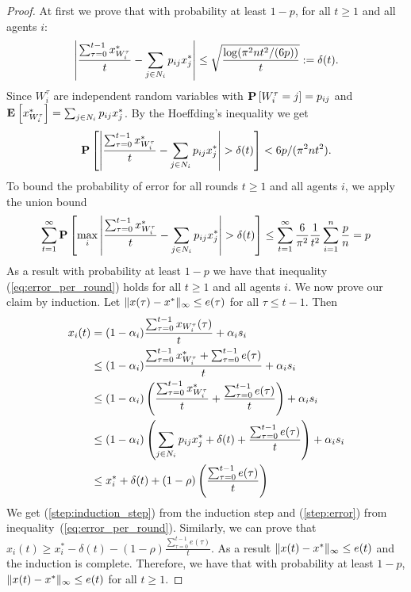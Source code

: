 \begin{proof}
At first we prove that with probability at least $1-p$,
for all $t \geq 1$ and all agents $i$:
\begin{equation}\label{eq:error_per_round}
    \left|
    \frac{\sum_{\tau=0}^{t-1} x^*_{W_i^\tau}}{t} -
    \sum_{j \in N_i} p_{ij} x^*_j
    \right| \leq
    \sqrt{ \frac{\log(\pi^2 n t^2/(6 p))}{t}} :=
    \delta(t).
\end{equation}
Since $W_i^\tau$ are independent random variables with
$\bm{\mathrm{P}}\left[W_i^\tau = j\right]=p_{ij}$ and \(\Exp{x^*_{W_i^\tau}} = \sum_{j \in N_i} p_{ij} x^*_j\).
By the Hoeffding's inequality we get
  \[
    \bm{\mathrm{P}}\left[
      \left|
      \frac{\sum_{\tau=0}^{t-1} x^*_{W_i^\tau}}{t}
      - \sum_{j \in N_i} p_{ij} x^*_j \right|
      > \delta(t)
     \right]
    < 6 p / (\pi^2 n t^2).
  \]
To bound the probability of error for all rounds $t\geq1$
and all agents $i$, we apply the union bound
  \begin{align*}
    \sum_{t=1}^{\infty}
    \bm{\mathrm{P}}\left[ \max_{i}
      \left|
      \frac{\sum_{\tau=0}^{t-1} x^*_{W_i^{\tau}}}{t}
      - \sum_{j \in N_i} p_{ij} x^*_j \right|
      > \delta(t)\right]
    \leq
    \sum_{t=1}^{\infty} \frac{6}{\pi^2} \frac{1}{t^2} \sum_{i=1}^n \frac{p}{n} =
    p
  \end{align*}
As a result with probability at least $1-p$ we have that
inequality (\ref{eq:error_per_round}) holds for all $t\geq 1$ and all
agents $i$.
We now prove our claim by induction.
Let $\| x(\tau)-x^* \|_{\infty} \leq e(\tau)$ for all
$\tau \leq t-1$. Then
\begin{align}
    x_i(t)
    &=
    (1-\alpha_i)\frac{\sum_{\tau=0}^{t-1}x_{W_i^{\tau}}(\tau)}{t}
    + \alpha_i s_i \nonumber \\
    &\leq
    (1-\alpha_i)\frac{\sum_{\tau=0}^{t-1}x^*_{W_i^{\tau}} +
      \sum_{\tau=0}^{t-1} e(\tau)}{t} + \alpha_i s_i \label{step:induction_step}\\
    &\leq
    (1-\alpha_i)
    \left(
    \frac{\sum_{\tau=0}^{t-1}x^*_{W_i^{\tau}}}{t}+
    \frac{\sum_{\tau=0}^{t-1} e(\tau)}{t}
    \right)
    + \alpha_i s_i \nonumber\\
    &\leq
    (1-\alpha_i)\left(\sum_{j \in N_i} p_{ij} x^*_{j} +
    \delta(t) + \frac{\sum_{\tau=0}^{t-1} e(\tau)}{t} \right) +
    \alpha_i s_i \label{step:error} \\
    &\leq
    x_i^* + \delta(t) + (1-\rho)
    \left(
    \frac{\sum_{\tau=0}^{t-1} e(\tau)}{t}
    \right)
    \nonumber
  \end{align}
  We get (\ref{step:induction_step}) from the induction step and
  (\ref{step:error}) from inequality~(\ref{eq:error_per_round}).
  Similarly, we can prove that
  $x_i(t) \geq x_i^* - \delta(t) - (1-\rho)
  \frac{\sum_{\tau=0}^{t-1} e(\tau)}{t}$.
  As a result $\| x(t)-x^* \|_{\infty} \leq e(t)$ and the induction
  is complete.  Therefore, we have that with probability at least $1-p$,
  \(\| x(t) - x^* \|_{\infty} \leq e(t)\) for all $t\geq 1$.
\end{proof}

